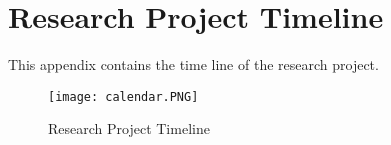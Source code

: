 %
%
%                 

\chapter{Research Project Timeline}
\label{sec:appendixc}

This appendix contains the time line of the research project.

\begin{figure}[h]
	\centering
	\captionsetup{justification=centering}
	\texttt{[image: calendar.PNG]}
	\caption{Research Project Timeline}
	\label{fig:calendar}
\end{figure}

